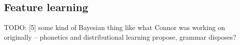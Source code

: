 \documentclass[11pt, oneside]{article}   	%
\begin{document}
\subsection{Feature learning}






TODO: [5] some kind of Bayesian thing like what Connor was working on originally -- phonetics and distributional learning propose, grammar disposes?




\end{document}
